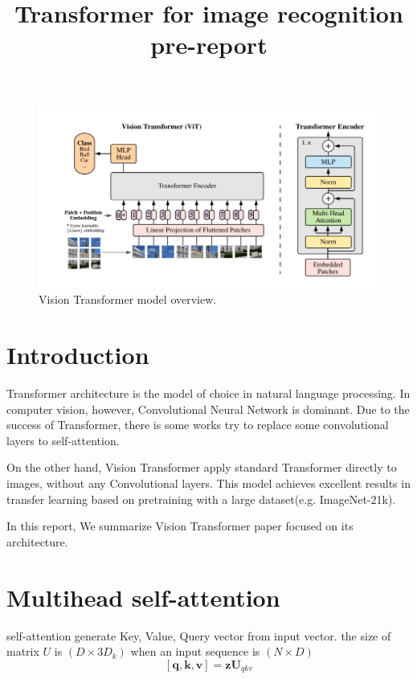 \documentclass[extendedabs]{bmvc2k}
\begin{document}
\title{Transformer for image recognition pre-report}

 

\maketitle
\noindent

\begin{figure}[t]
\label{fig:modelarch}
	\includegraphics[width=\linewidth]{images/fig.png}
	\caption{
		Vision Transformer model overview.}
	\vspace{-2mm}
\end{figure}

\section{Introduction}
Transformer\cite{attentionneed} architecture is the model of choice in natural language processing. In computer vision, however, Convolutional Neural Network is dominant. Due to the success of Transformer, there is some works try to replace some convolutional layers to self-attention.

On the other hand, Vision Transformer\cite{transformerimage} apply standard Transformer directly to images, without any Convolutional layers. This model achieves excellent results in transfer learning based on pretraining with a large dataset(e.g. ImageNet-21k).

In this report, We summarize Vision Transformer paper\cite{transformerimage} focused on its architecture.

\section{Multihead self-attention}
self-attention generate Key, Value, Query vector from input vector. the size of matrix $U$ is $(D\times 3D_k)$ when an input sequence is $(N\times D)$
$$
[\textbf{q},\textbf{k},\textbf{v}] = \textbf{z}\textbf{U}_{qkv}
$$
\end{document}
